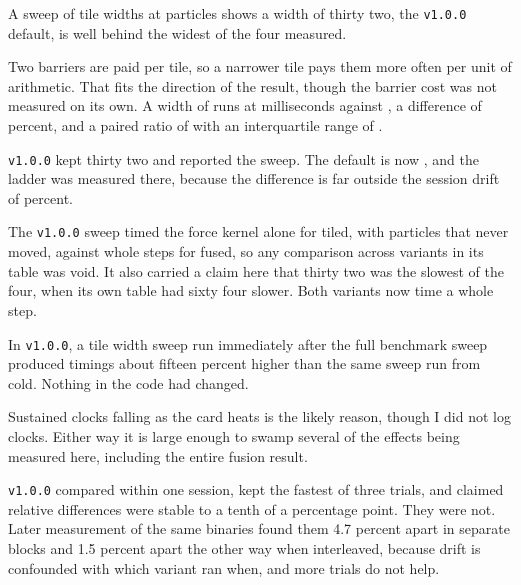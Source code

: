 
 A sweep of tile widths at \TileSweepParticles{} particles shows a width of
thirty two, the \texttt{v1.0.0} default, is well behind the widest of the four measured.

\begin{center}

\end{center}

 Two barriers are paid per tile, so a narrower tile pays them more often per
unit of arithmetic. That fits the direction of the result, though the barrier cost was not
measured on its own. A width of \BestTileWidth{} runs at \BestTileMs{} milliseconds against
\TileThirtyTwoMs{}, a difference of \TileWidthGainPercent{} percent, and a paired ratio of
\BestTileOverTileThirtyTwoRatio{} with an interquartile range of
\BestTileOverTileThirtyTwoRatioIqr{}.

 \texttt{v1.0.0} kept thirty two and reported the sweep. The default is now
\BestTileWidth{}, and the ladder was measured there, because the difference is far outside the
session drift of \RepeatabilitySpread{} percent.

 The \texttt{v1.0.0} sweep timed the force kernel alone for
tiled, with particles that never moved, against whole steps for fused, so any comparison across
variants in its table was void. It also carried a claim here that thirty two was the slowest of
the four, when its own table had sixty four slower. Both variants now time a whole step.


 In \texttt{v1.0.0}, a tile width sweep run immediately after the full benchmark
sweep produced timings about fifteen percent higher than the same sweep run from cold. Nothing
in the code had changed.

 Sustained clocks falling as the card heats is the likely reason, though I did
not log clocks. Either way it is large enough to swamp several of the effects being measured
here, including the entire fusion result.

 \texttt{v1.0.0} compared within one session, kept the
fastest of three trials, and claimed relative differences were stable to a tenth of a percentage
point. They were not. Later measurement of the same binaries found them 4.7 percent apart in
separate blocks and 1.5 percent apart the other way when interleaved, because drift is confounded
with which variant ran when, and more trials do not help.

